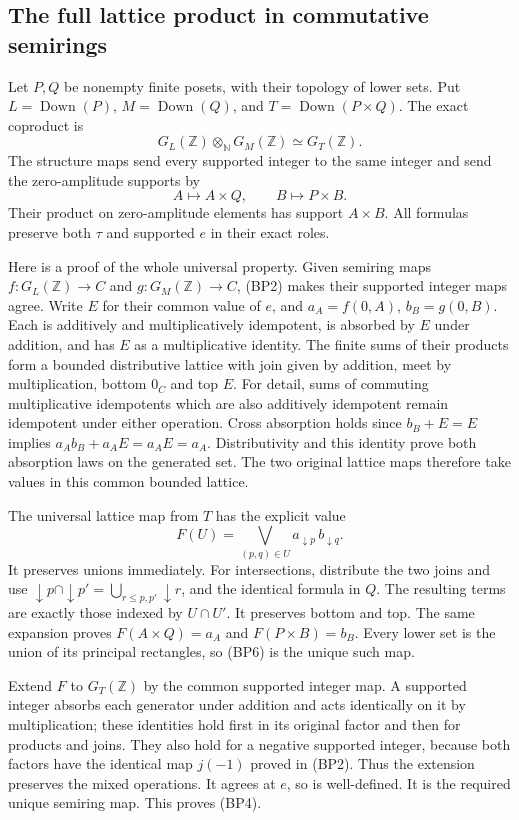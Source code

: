 \subsection{The full lattice product in commutative semirings}

Let $P,Q$ be nonempty finite posets, with their topology of lower
sets. Put $L=\operatorname{Down}(P)$, $M=\operatorname{Down}(Q)$,
and $T=\operatorname{Down}(P\times Q)$. The exact coproduct is
\[
 G_L(\mathbb Z)\otimes_{\mathbb N}G_M(\mathbb Z)
       \simeq G_T(\mathbb Z).
 \tag{BP4}
\]
The structure maps send every supported integer to the same integer
and send the zero-amplitude supports by
\[
 A\longmapsto A\times Q,\qquad B\longmapsto P\times B.
 \tag{BP5}
\]
Their product on zero-amplitude elements has support $A\times B$.
All formulas preserve both $\tau$ and supported $e$ in their exact
roles.

Here is a proof of the whole universal property. Given semiring maps
$f:G_L(\mathbb Z)\to C$ and $g:G_M(\mathbb Z)\to C$, (BP2)
makes their supported integer maps agree. Write $E$ for their common
value of $e$, and $a_A=f(0,A)$, $b_B=g(0,B)$. Each is additively
and multiplicatively idempotent, is absorbed by $E$ under addition,
and has $E$ as a multiplicative identity. The finite sums of their
products form a bounded distributive lattice with join given by
addition, meet by multiplication, bottom $0_C$ and top $E$.
For detail, sums of commuting multiplicative idempotents which are
also additively idempotent remain idempotent under either operation.
Cross absorption holds since $b_B+E=E$ implies
$a_Ab_B+a_AE=a_AE=a_A$. Distributivity and this identity prove both
absorption laws on the generated set. The two original lattice maps
therefore take values in this common bounded lattice.

The universal lattice map from $T$ has the explicit value
\[
 F(U)=\bigvee_{(p,q)\in U} a_{\downarrow p}\,b_{\downarrow q}.
 \tag{BP6}
\]
It preserves unions immediately. For intersections, distribute the
two joins and use
$\downarrow p\cap\downarrow p'
 =\bigcup_{r\le p,p'}\downarrow r$, and the identical formula
in $Q$. The resulting terms are exactly those indexed by $U\cap U'$.
It preserves bottom and top. The same expansion proves
$F(A\times Q)=a_A$ and $F(P\times B)=b_B$. Every lower set is the
union of its principal rectangles, so (BP6) is the unique such map.

Extend $F$ to $G_T(\mathbb Z)$ by the common supported integer map.
A supported integer absorbs each generator under addition and
acts identically on it by multiplication; these identities hold
first in its original factor and then for products and joins.
They also hold for a negative supported integer, because both factors
have the identical map $j(-1)$ proved in (BP2). Thus the extension
preserves the mixed operations. It agrees at $e$, so is well-defined.
It is the required unique semiring map. This proves (BP4).

